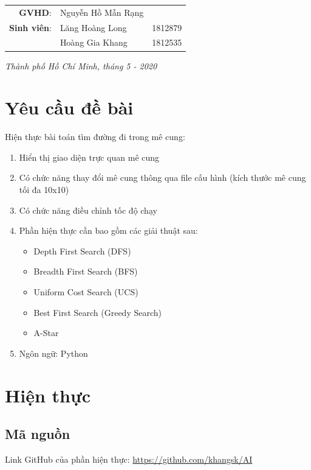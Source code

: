 \documentclass[a4paper]{article}
\begin{document}
\begin{titlepage}
\begin{center}
			\begin{table}[h]
				\begin{tabular}{rlr}
					\hspace{3cm}
					\textbf{GVHD}:      & Nguyễn Hồ Mẫn Rạng &         \\
					\textbf{Sinh viên}: & Lăng Hoàng Long    & 1812879 \\
					                    & Hoàng Gia Khang    & 1812535 \\
				\end{tabular}
			\end{table}

			\vspace{3cm}

			\textit{Thành phố Hồ Chí Minh, tháng 5 - 2020}
		\end{center}
	\end{titlepage}



	\section{Yêu cầu đề bài}
	Hiện thực bài toán tìm đường đi trong mê cung:
	\begin{enumerate}
		\item Hiển thị giao diện trực quan mê cung
		\item Có chức năng thay đổi mê cung thông qua file cấu hình (kích thước mê cung tối đa 10x10)
		\item Có chức năng điều chỉnh tốc độ chạy
		\item Phần hiện thực cần bao gồm các giải thuật sau:
			\begin{itemize}
				\item Depth First Search (DFS)
				\item Breadth First Search (BFS)
				\item Uniform Cost Search (UCS)
				\item Best First Search (Greedy Search)
				\item A-Star
			\end{itemize}
		\item Ngôn ngữ: Python
	\end{enumerate}

	\section{Hiện thực}
	\subsection{Mã nguồn}
	Link GitHub của phần hiện thực: \url{https://github.com/khangsk/AI}\\
\end{document}
